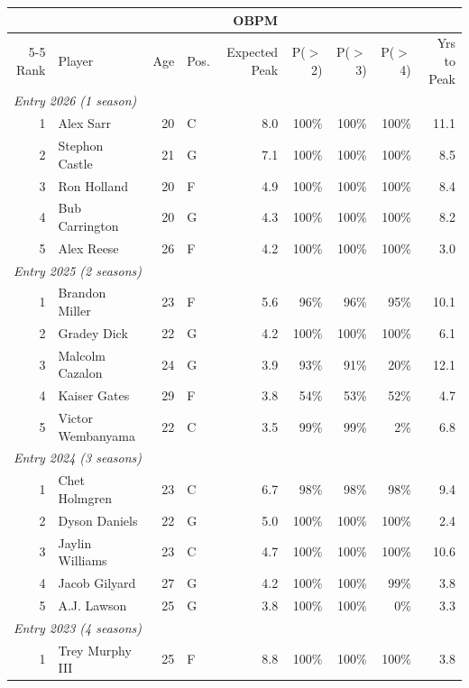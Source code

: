 \begin{table}[htbp]
  \centering\small
  \begin{tabular}{rlrlrrrrr}
    \toprule
     & & & & OBPM & & & & \\
    \cmidrule(lr){5-5}
    Rank & Player & Age & Pos. & Expected Peak & P($>$2) & P($>$3) & P($>$4) & Yrs to Peak \\
    \midrule
    \multicolumn{9}{l}{\textit{Entry 2026 (1 season)}} \\
    \midrule
    1 & Alex Sarr & 20 & C & 8.0 & 100\% & 100\% & 100\% & 11.1 \\
    2 & Stephon Castle & 21 & G & 7.1 & 100\% & 100\% & 100\% & 8.5 \\
    3 & Ron Holland & 20 & F & 4.9 & 100\% & 100\% & 100\% & 8.4 \\
    4 & Bub Carrington & 20 & G & 4.3 & 100\% & 100\% & 100\% & 8.2 \\
    5 & Alex Reese & 26 & F & 4.2 & 100\% & 100\% & 100\% & 3.0 \\
    \midrule[0.4pt]
    \multicolumn{9}{l}{\textit{Entry 2025 (2 seasons)}} \\
    \midrule
    1 & Brandon Miller & 23 & F & 5.6 & 96\% & 96\% & 95\% & 10.1 \\
    2 & Gradey Dick & 22 & G & 4.2 & 100\% & 100\% & 100\% & 6.1 \\
    3 & Malcolm Cazalon & 24 & G & 3.9 & 93\% & 91\% & 20\% & 12.1 \\
    4 & Kaiser Gates & 29 & F & 3.8 & 54\% & 53\% & 52\% & 4.7 \\
    5 & Victor Wembanyama & 22 & C & 3.5 & 99\% & 99\% & 2\% & 6.8 \\
    \midrule[0.4pt]
    \multicolumn{9}{l}{\textit{Entry 2024 (3 seasons)}} \\
    \midrule
    1 & Chet Holmgren & 23 & C & 6.7 & 98\% & 98\% & 98\% & 9.4 \\
    2 & Dyson Daniels & 22 & G & 5.0 & 100\% & 100\% & 100\% & 2.4 \\
    3 & Jaylin Williams & 23 & C & 4.7 & 100\% & 100\% & 100\% & 10.6 \\
    4 & Jacob Gilyard & 27 & G & 4.2 & 100\% & 100\% & 99\% & 3.8 \\
    5 & A.J. Lawson & 25 & G & 3.8 & 100\% & 100\% & 0\% & 3.3 \\
    \midrule[0.4pt]
    \multicolumn{9}{l}{\textit{Entry 2023 (4 seasons)}} \\
    \midrule
    1 & Trey Murphy III & 25 & F & 8.8 & 100\% & 100\% & 100\% & 3.8 \\

\end{tabular}
\end{table}
